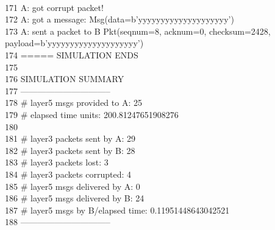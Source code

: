 \documentclass{article}
\begin{document}
{\\
171 A: got corrupt packet! \\
172 A: got a message: Msg(data=b'yyyyyyyyyyyyyyyyyyyy') \\
173 A: sent a packet to B Pkt(seqnum=8, acknum=0, checksum=2428,
payload=b'yyyyyyyyyyyyyyyyyyyy') \\
174 ===== SIMULATION ENDS \\
175  \\
176 SIMULATION SUMMARY \\
177 -------------------------------- \\
178 \# layer5 msgs provided to A:      25 \\
179 \# elapsed time units:             200.81247651908276 \\
180  \\
181 \# layer3 packets sent by A:       29 \\
182 \# layer3 packets sent by B:       28 \\
183 \# layer3 packets lost:            3 \\
184 \# layer3 packets corrupted:       4 \\
185 \# layer5 msgs delivered by A:     0 \\
186 \# layer5 msgs delivered by B:     24 \\
187 \# layer5 msgs by B/elapsed time:  0.11951448643042521 \\
188 -------------------------------- \\
}
\pagebreak
\end{document}
